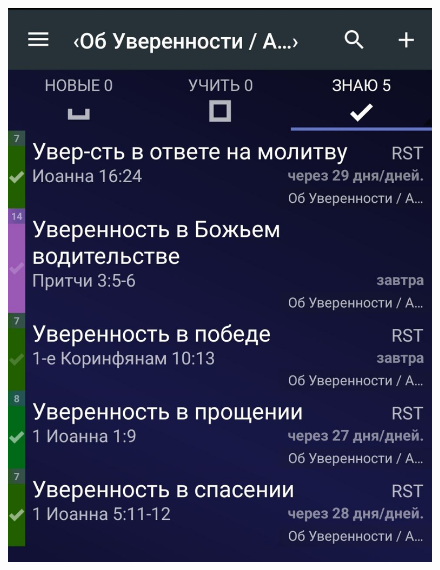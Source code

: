 \documentclass[t,aspectratio=169]{beamer}  %
\begin{document}
\begin{frame}[c]
\begin{multicols}{2}
\begin{center}
\begin{figure}
			\includegraphics[height=0.8\textheight]{remember-me-lists}
			\end{figure}		
		\end{center}
	 \end{multicols}
\end{frame}
\end{document}
